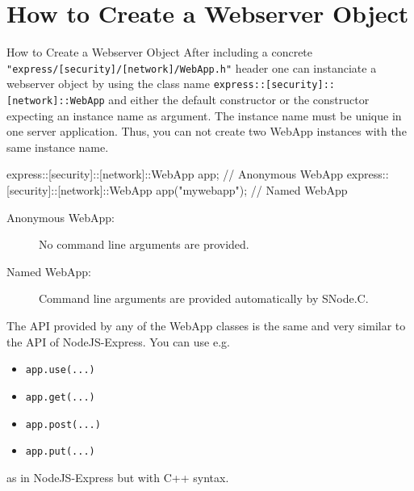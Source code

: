﻿\section[nosectionpage]{How to Create a Webserver Object}

\begin{frame}[fragile]{How to Create a Webserver Object}
  After including a concrete \lstinline|"express/[security]/[network]/WebApp.h"| header one can instanciate a webserver object by using the class name \lstinline|express::[security]::[network]::WebApp| and either the \textcolor{fh-ooe-red}{default constructor} or the \textcolor{fh-ooe-red}{constructor expecting} an \textcolor{fh-ooe-red}{instance name} as argument.
  The \textcolor{fh-ooe-red}{instance name} must be \textcolor{fh-ooe-red}{unique} in one server application. Thus, you can \textcolor{fh-ooe-red}{not} create \textcolor{fh-ooe-red}{two WebApp instances} with the \textcolor{fh-ooe-red}{same instance name}.

  \begin{cppcode}[gobble=4]
    express::[security]::[network]::WebApp app;             // Anonymous WebApp
    express::[security]::[network]::WebApp app("mywebapp"); // Named WebApp
  \end{cppcode}
  \begin{description}
    \item [Anonymous WebApp:] No command line arguments are provided.
    \item [Named WebApp:] Command line arguments are provided automatically by SNode.C.
  \end{description}
  The \textcolor{fh-ooe-red}{API} provided by any of the \textcolor{fh-ooe-red}{WebApp} classes is the same and very \textcolor{fh-ooe-red}{similar} to the \textcolor{fh-ooe-red}{API of NodeJS-Express}. You can use e.g.
  \begin{itemize}
    \item \lstinline|app.use(...)|
    \item \lstinline|app.get(...)|
    \item \lstinline|app.post(...)|
    \item \lstinline|app.put(...)|
  \end{itemize}
  as in NodeJS-Express but with C++ syntax.
\end{frame}
